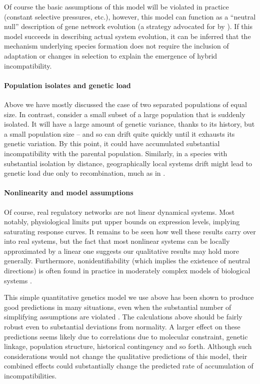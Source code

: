 \documentclass{article}
\newcommand{\1}{\mathbbm{1}}
\begin{document}
Of course the basic assumptions of this model will be violated in practice (constant selective pressures, etc.), however, this model can function as a ``neutral null'' description of gene network evolution (a strategy advocated for by \citet{lynch2007frailty, fay2008evaluating, koonin2016splendor}). If this model succeeds in describing actual system evolution, it can be inferred that the mechanism underlying species formation does not require the inclusion of adaptation or changes in selection to explain the emergence of hybrid incompatibility.

\paragraph{Population isolates and genetic load}
Above we have mostly discussed the case of two separated populations of equal size.
In contrast, consider a small subset of a large population that is suddenly isolated.
It will have a large amount of genetic variance, thanks to its history,
but a small population size -- and so can drift quite quickly until it exhausts its genetic variation.
By this point, it could have accumulated substantial incompatibility with the parental population.
Similarly, in a species with substantial isolation by distance, geographically local systems drift
might lead to genetic load due only to recombination, much as in \citep{phillips1996maintenance}.

\paragraph{Nonlinearity and model assumptions}
Of course, real regulatory networks are not linear dynamical systems.
Most notably, physiological limits put upper bounds on expression levels,
implying saturating response curves.
It remains to be seen how well these results carry over into real systems,
but the fact that most nonlinear systems can be locally approximated by a linear one
suggests our qualitative results may hold more generally.
Furthermore, nonidentifiability (which implies the existence of neutral directions)
is often found in practice in moderately complex models of biological systems \citep{gutenkunst2007universally, piazza2008diverse}.

This simple quantitative genetics model we use above
has been shown to produce good predictions in many situations,
even when the substantial number of simplifying assumptions are violated \citep{burger1994distribution,turelli1994genetic}.
The calculations above should be fairly robust even to substantial deviations from normality.
A larger effect on these predictions seems likely due to 
correlations due to molecular constraint, genetic linkage, population structure, historical contingency and so forth.
Although such considerations would not change the qualitative predictions of this model,
their combined effects could substantially change the predicted rate of accumulation of incompatibilities.
\end{document}
